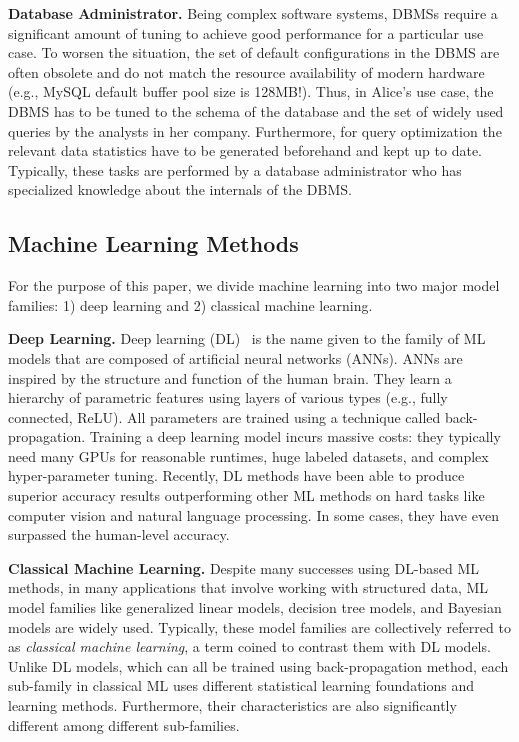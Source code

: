 \vspace{2mm}
\noindent \textbf{Database Administrator.} Being complex software systems, DBMSs require a significant amount of tuning to achieve good performance for a particular use case.
To worsen the situation, the set of default configurations in the DBMS are often obsolete and do not match the resource availability of modern hardware (e.g., MySQL default buffer pool size is 128MB!).
Thus, in Alice's use case, the DBMS has to be tuned to the schema of the database and the set of widely used queries by the analysts in her company.
Furthermore, for query optimization the relevant data statistics have to be generated beforehand and kept up to date.
Typically, these tasks are performed by a database administrator who has specialized knowledge about the internals of the DBMS.


\subsection{Machine Learning Methods}
For the purpose of this paper, we divide machine learning into two major model families: 1) deep learning and 2) classical machine learning.

\vspace{2mm}
\noindent \textbf{Deep Learning. } Deep learning (DL)~\cite{dlbook} is the name given to the family of ML models that are composed of artificial neural networks (ANNs).
ANNs are inspired by the structure and function of the human brain.
They learn a hierarchy of parametric features using layers of various types (e.g., fully connected, ReLU).
All parameters are trained using a technique called back-propagation.
Training a deep learning model incurs massive costs: they typically need many GPUs for reasonable runtimes, huge labeled datasets, and complex hyper-parameter tuning.
Recently, DL methods have been able to produce superior accuracy results outperforming other ML methods on hard tasks like computer vision and natural language processing.
In some cases, they have even surpassed the human-level accuracy.

\vspace{2mm}
\noindent \textbf{Classical Machine Learning. } Despite many successes using DL-based ML methods, in many applications that involve working with structured data, ML model families like generalized linear models, decision tree models, and Bayesian models are widely used.
Typically, these model families are collectively referred to as \textit{classical machine learning}, a term coined to contrast them with DL models.
Unlike DL models, which can all be trained using back-propagation method, each sub-family in classical ML uses different statistical learning foundations and learning methods.
Furthermore, their characteristics are also significantly different among different sub-families.

